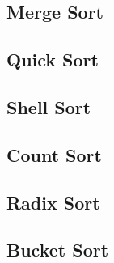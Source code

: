 \documentclass[../algorytmy.tex]{subfiles}
\begin{document}
    \subsection{Merge Sort}
    
    \pagebreak

    \subsection{Quick Sort}
    
    \pagebreak

    \subsection{Shell Sort}
    
    \pagebreak

    \subsection{Count Sort}
    
    \pagebreak

    \subsection{Radix Sort}
    
    \pagebreak

    \subsection{Bucket Sort}
    
    \pagebreak

\end{document}
